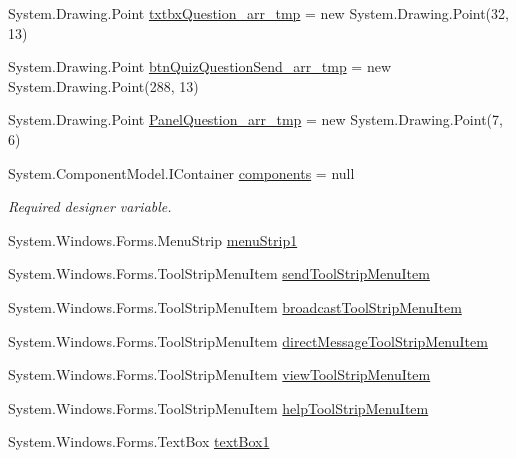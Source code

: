 \begin{DoxyCompactItemize}
\item 
\-System.\-Drawing.\-Point \hyperlink{class_sr_p___classroom_inq_1_1frm_classrrom_inq_a09f25b6934ed463e8b781498b5511796}{txtbx\-Question\-\_\-arr\-\_\-tmp} = new \-System.\-Drawing.\-Point(32, 13)
\item 
\-System.\-Drawing.\-Point \hyperlink{class_sr_p___classroom_inq_1_1frm_classrrom_inq_a8dcbe5ae5d44d445994571c17345e756}{btn\-Quiz\-Question\-Send\-\_\-arr\-\_\-tmp} = new \-System.\-Drawing.\-Point(288, 13)
\item 
\-System.\-Drawing.\-Point \hyperlink{class_sr_p___classroom_inq_1_1frm_classrrom_inq_a3e546b9b0c603a788d0316efe572c960}{\-Panel\-Question\-\_\-arr\-\_\-tmp} = new \-System.\-Drawing.\-Point(7, 6)
\item 
\-System.\-Component\-Model.\-I\-Container \hyperlink{class_sr_p___classroom_inq_1_1frm_classrrom_inq_a9ae295b3d0621cd5e50bcf8a475c0686}{components} = null
\begin{DoxyCompactList}\small\item\em \-Required designer variable. \end{DoxyCompactList}\item 
\-System.\-Windows.\-Forms.\-Menu\-Strip \hyperlink{class_sr_p___classroom_inq_1_1frm_classrrom_inq_a549704b03b13cfbb5cbc07c18c0c600a}{menu\-Strip1}
\item 
\-System.\-Windows.\-Forms.\-Tool\-Strip\-Menu\-Item \hyperlink{class_sr_p___classroom_inq_1_1frm_classrrom_inq_ab491a97cbd395fd4e69e4312fdc48eeb}{send\-Tool\-Strip\-Menu\-Item}
\item 
\-System.\-Windows.\-Forms.\-Tool\-Strip\-Menu\-Item \hyperlink{class_sr_p___classroom_inq_1_1frm_classrrom_inq_ac34894d134f025ca6e53b41c744bcf8e}{broadcast\-Tool\-Strip\-Menu\-Item}
\item 
\-System.\-Windows.\-Forms.\-Tool\-Strip\-Menu\-Item \hyperlink{class_sr_p___classroom_inq_1_1frm_classrrom_inq_a8df7e0c2f5ac4cb1494004d85940a786}{direct\-Message\-Tool\-Strip\-Menu\-Item}
\item 
\-System.\-Windows.\-Forms.\-Tool\-Strip\-Menu\-Item \hyperlink{class_sr_p___classroom_inq_1_1frm_classrrom_inq_a703cf9f48d3d8aa2b88e8d9490600c54}{view\-Tool\-Strip\-Menu\-Item}
\item 
\-System.\-Windows.\-Forms.\-Tool\-Strip\-Menu\-Item \hyperlink{class_sr_p___classroom_inq_1_1frm_classrrom_inq_a2cf34a0cb0b52c60e6faea821b2ce0a9}{help\-Tool\-Strip\-Menu\-Item}
\item 
\-System.\-Windows.\-Forms.\-Text\-Box \hyperlink{class_sr_p___classroom_inq_1_1frm_classrrom_inq_a3ee11679c61cc3228121b7fe4f51d0c8}{text\-Box1}

\end{DoxyCompactItemize}

